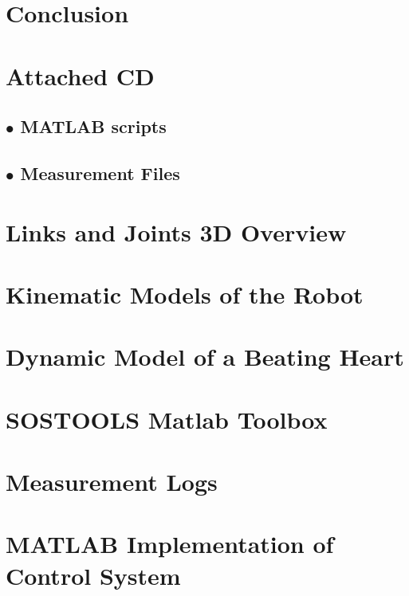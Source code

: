\chapter{Conclusion}\label{chap:conclusion}


\begingroup
\raggedright
\clearpage
{}

\endgroup
\label{sourceliste}

\newpage

\begin{appendices}
\appendix
\renewcommand{\appendixname}{Appendix}
\renewcommand{\appendixtocname}{Appendix}

\chapter{Attached CD}\label{app:cd}
   \section*{$\bullet$ MATLAB scripts}
   \section*{$\bullet$ Measurement Files}



\chapter{Links and Joints 3D Overview}\label{app:links_joints_3d}


\chapter{Kinematic Models of the Robot}\label{app:kinematic_model_robot}


\chapter{Dynamic Model of a Beating Heart}\label{app:dynamic_model_heart}


\chapter{SOSTOOLS Matlab Toolbox}\label{app:sostools}


\chapter{Measurement Logs}\label{app:meas}


\chapter{MATLAB Implementation of Control System}
\label{{app:slide_implement_1}}

\end{appendices}

